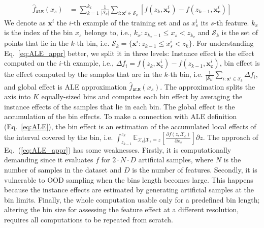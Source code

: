 \documentclass[wcp]{jmlr}
\newcommand{\Xcb}{\mathcal{X}_c}
\newcommand{\xci}{\mathbf{x}^i_{\mathbf{c}}}
\newcommand{\xb}{\mathbf{x}}
\newcommand{\E}{\mathbb{E}}
\begin{document}
\begin{align} \hat{f}_{\mathtt{ALE}}(x_s) &= \sum_{k=1}^{k_x} \frac{1}{|\mathcal{S}_k|} \sum_{i:\xb^i \in \mathcal{S}_k} [f(z_k,\xci) - f(z_{k-1}, \xci)]
  \label{eq:ALE_appr}
\end{align}
%
We denote as \( \xb^i \) the \(i\)-th example of the training set and as \(x_s^i\) its \(s\)-th feature. \(k_x\) is the index of the bin \(x_s\) belongs to, i.e., \(k_x: z_{k_x-1} \leq x_s < z_{k_x} \) and \(\mathcal{S}_k\) is the set of points that lie in the \(k\)-th bin, i.e.  \( \mathcal{S}_k = \{ \xb^i : z_{k-1} \leq x^i_s < z_{k} \} \).  For understanding Eq.~\eqref{eq:ALE_appr} better, we split it in three levels: Instance effect is the effect computed on the \(i\)-th example, i.e., \(\Delta f_i = f(z_k,\xci) - f(z_{k-1}, \xci)\), bin effect is the effect computed by the samples that are in the \(k\)-th bin, i.e.  \(\frac{1}{|\mathcal{S}_k|} \sum_{i:\xb^i \in \mathcal{S}_k} \Delta f_i \), and global effect is ALE approximation \(\hat{f}_{\mathtt{ALE}}(x_s)\). The approximation splits the axis into \( K \) equally-sized bins and computes each bin effect by averaging the instance effects of the samples that lie in each bin. The global effect is the accumulation of the bin effects. To make a connection with ALE definition (Eq.~\ref{eq:ALE}), the bin effect is an estimation of the accumulated local effects of the interval covered by the bin, i.e.  \(\int_{z_{k-1}}^{z_k} \E_{\Xcb|\mathcal{X}_s=z}\left[\frac{\partial f(z,\Xcb)}{\partial x_s}\right] \partial z \).
%
The approach of Eq.~(\ref{eq:ALE_appr}) has some weaknesses. Firstly, it is computationally demanding since it evaluates \(f\) for \(2 \cdot N \cdot D\) artificial samples, where \(N\) is the number of samples in the dataset and \(D\) is the number of features.  Secondly, it is vulnerable to OOD sampling when the bins length becomes large. This happens because the instance effects are estimated by generating artificial samples at the bin limits. Finally, the whole computation usable only for a predefined bin length; altering the bin size for assessing the feature effect at a different resolution, requires all computations to be repeated from scratch.
\end{document}
